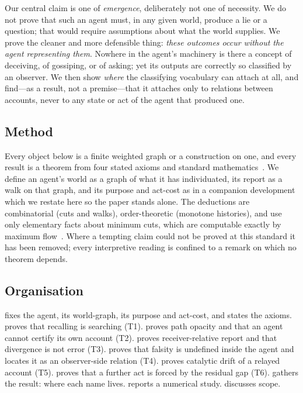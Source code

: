 \documentclass[11pt,twocolumn,a4paper]{article}
\begin{document}
Our central claim is one of \emph{emergence}, deliberately not one of
necessity. We do not prove that such an agent must, in any given world,
produce a lie or a question; that would require assumptions about what the
world supplies. We prove the cleaner and more defensible thing: \emph{these
outcomes occur without the agent representing them}. Nowhere in the agent's
machinery is there a concept of deceiving, of gossiping, or of asking; yet
its outputs are correctly so classified by an observer. We then show
\emph{where} the classifying vocabulary can attach at all, and find---as a
result, not a premise---that it attaches only to relations between
accounts, never to any state or act of the agent that produced one.

\subsection{Method}

Every object below is a finite weighted graph or a construction on one, and
every result is a theorem from four stated axioms and standard
mathematics~\cite{bondymurty2008,diestel2017}.
We define an agent's world as a graph of what it has individuated, its
report as a walk on that graph, and its purpose and act-cost as in a
companion development which we restate here so the paper stands alone. The
deductions are combinatorial (cuts and walks), order-theoretic (monotone
histories), and use only elementary facts about minimum cuts, which are
computable exactly by maximum flow~\cite{fordfulkerson1956,menger1927,%
edmondskarp1972,cormen2009}. Where a tempting claim could not be
proved at this standard it has been removed; every interpretive reading is
confined to a remark on which no theorem depends.

\subsection{Organisation}

 fixes the agent, its world-graph, its purpose and
act-cost, and states the axioms.  proves that
recalling is searching (T1).  proves path opacity and
that an agent cannot certify its own account (T2). 
proves receiver-relative report and that divergence is not error (T3).
 proves that falsity is undefined inside the agent and
locates it as an observer-side relation (T4).  proves
catalytic drift of a relayed account (T5).  proves that a
further act is forced by the residual gap (T6). 
gathers the result: where each name lives.  reports a
numerical study.  discusses scope.
\end{document}
